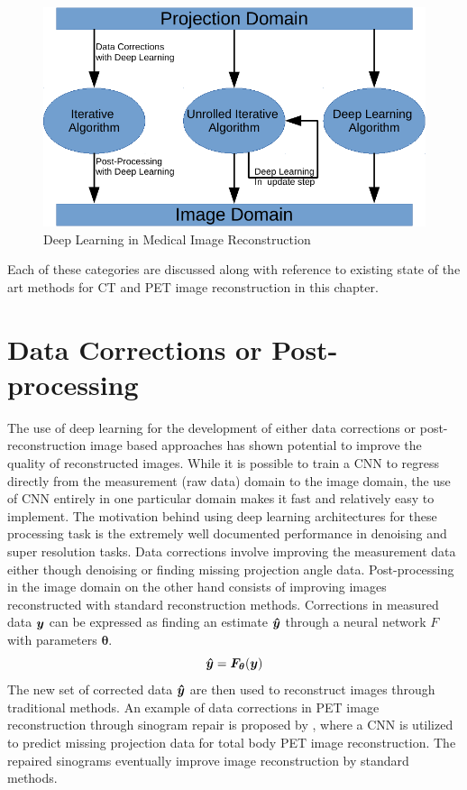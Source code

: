\begin{figure}[!htbp]
	\centering
	\includegraphics[width=0.8\linewidth]{./Figures/dl_mi.pdf}
	\caption{Deep Learning in Medical Image Reconstruction}
	\label{fig:dl}
\end{figure}


Each of these categories are discussed along with reference to existing state of the art methods for \ac{CT} and \ac{PET} image reconstruction in this chapter. 

\section{Data Corrections or Post-processing}

The use of deep learning for the development of either data corrections or post-reconstruction  image based approaches has shown potential to improve the quality of reconstructed images. While it is possible to train a \ac{CNN} to regress directly from the measurement (raw data) domain to the image domain, the use of \ac{CNN} entirely in one particular domain makes it fast and relatively easy to implement. The motivation behind using deep learning architectures for these processing task is the extremely well documented performance in denoising and super resolution tasks. Data corrections involve improving the measurement data either though denoising or finding missing projection angle data. Post-processing in the image domain on the other hand consists of improving images reconstructed with standard reconstruction methods. 
Corrections in measured data $\bm{y}$ can be expressed as finding an estimate $\bm{\hat{y}}$ through a neural network $F$ with parameters $\bm{\theta}$. 
\begin{equation}\label{eq:data_cor}
	\bm{\hat{y}} = \bm{F}_{\bm{\theta}} (\bm{y})
\end{equation} 
The new set of corrected data $\bm{\hat{y}}$ are then used to reconstruct images through traditional methods. An example of data corrections in \ac{PET} image reconstruction through sinogram repair is proposed by \cite{whiteley2019cnn}, where a \ac{CNN} is utilized to predict missing projection data for total body \ac{PET} image reconstruction. The repaired sinograms eventually improve image reconstruction by standard methods.

